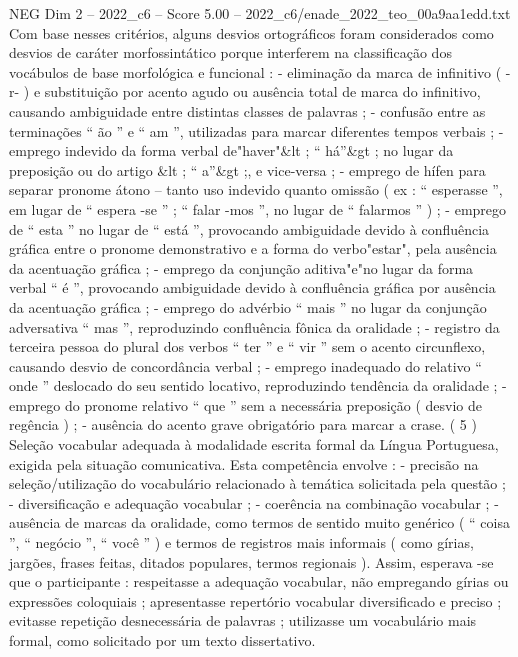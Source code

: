 \begin{textsample}{NEG Dim 2 – 2022\_c6 – Score 5.00 – 2022\_c6/enade\_2022\_teo\_00a9aa1edd.txt}
Com base nesses critérios, alguns desvios ortográficos foram considerados como desvios de caráter morfossintático porque interferem na classificação dos vocábulos de base morfológica e funcional : - eliminação da marca de infinitivo ( -r- ) e substituição por acento agudo ou ausência total de marca do infinitivo, causando ambiguidade entre distintas classes de palavras ; - confusão entre as terminações “ ão ” e “ am ”, utilizadas para marcar diferentes tempos verbais ; - emprego indevido da forma verbal de"haver"\&lt ; “ há”\&gt ; no lugar da preposição ou do artigo \&lt ; “ a”\&gt ;, e vice-versa ; - emprego de hífen para separar pronome átono – tanto uso indevido quanto omissão ( ex : “ esperasse ”, em lugar de “ espera -se ” ; “ falar -mos ”, no lugar de “ falarmos ” ) ; - emprego de “ esta ” no lugar de “ está ”, provocando ambiguidade devido à confluência gráfica entre o pronome demonstrativo e a forma do verbo"estar", pela ausência da acentuação gráfica ; - emprego da conjunção aditiva"e"no lugar da forma verbal “ é ”, provocando ambiguidade devido à confluência gráfica por ausência da acentuação gráfica ; - emprego do advérbio “ mais ” no lugar da conjunção adversativa “ mas ”, reproduzindo confluência fônica da oralidade ; - registro da terceira pessoa do plural dos verbos “ ter ” e “ vir ” sem o acento circunflexo, causando desvio de concordância verbal ; - emprego inadequado do relativo “ onde ” deslocado do seu sentido locativo, reproduzindo tendência da oralidade ; - emprego do pronome relativo “ que ” sem a necessária preposição ( desvio de regência ) ; - ausência do acento grave obrigatório para marcar a crase. ( 5 ) Seleção vocabular adequada à modalidade escrita formal da Língua Portuguesa, exigida pela situação comunicativa.
Esta competência envolve : - precisão na seleção/utilização do vocabulário relacionado à temática solicitada pela questão ; - diversificação e adequação vocabular ; - coerência na combinação vocabular ; - ausência de marcas da oralidade, como termos de sentido muito genérico ( “ coisa ”, “ negócio ”, “ você ” ) e termos de registros mais informais ( como gírias, jargões, frases feitas, ditados populares, termos regionais ).
Assim, esperava -se que o participante : respeitasse a adequação vocabular, não empregando gírias ou expressões coloquiais ; apresentasse repertório vocabular diversificado e preciso ; evitasse repetição desnecessária de palavras ; utilizasse um vocabulário mais formal, como solicitado por um texto dissertativo.

\end{textsample}
